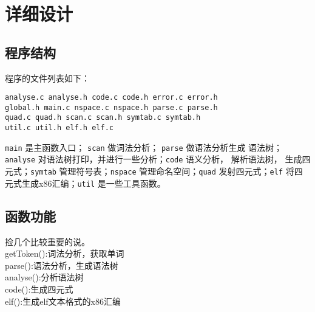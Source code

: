 \section{详细设计}
\subsection{程序结构}
程序的文件列表如下：
\begin{verbatim}
analyse.c analyse.h code.c code.h error.c error.h
global.h main.c nspace.c nspace.h parse.c parse.h
quad.c quad.h scan.c scan.h symtab.c symtab.h
util.c util.h elf.h elf.c
\end{verbatim}
\verb|main| 是主函数入口； \verb|scan| 做词法分析； \verb|parse| 做语法分析生成
语法树； \verb|analyse| 对语法树打印，并进行一些分析；\verb|code| 语义分析，
解析语法树，
生成四元式；\verb|symtab| 管理符号表；\verb|nspace| 管理命名空间；\verb|quad|
发射四元式；\verb|elf| 将四元式生成x86汇编；\verb|util| 是一些工具函数。
\subsection{函数功能}
捡几个比较重要的说。\\
getToken():词法分析，获取单词\\
parse():语法分析，生成语法树\\
analyse():分析语法树\\
code():生成四元式\\
elf():生成elf文本格式的x86汇编

